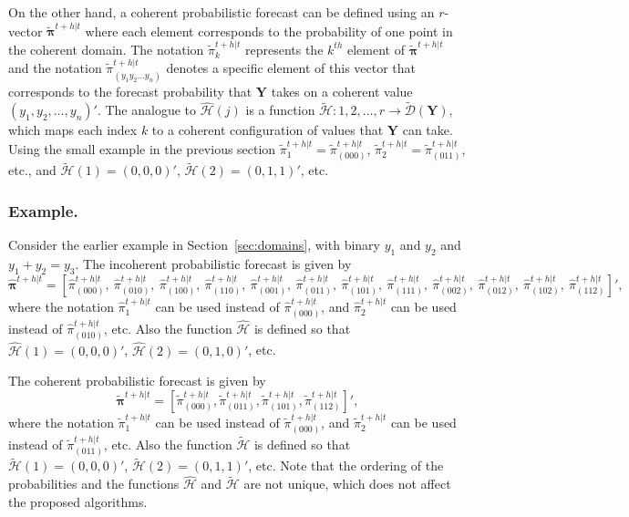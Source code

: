 \documentclass[a4paper,review,12pt,authoryear]{elsarticle}
\newcommand{\bY}{\mathbf{Y}}
\newcommand{\bpi}{\bm{\pi}}
\theoremstyle{definition}
\begin{document}
  On the other hand, a coherent probabilistic forecast can be defined using an $r$-vector $\tilde{\bpi}^{t+h|t}$ where each element corresponds to the probability of one point in the coherent domain.
  The notation $\tilde{\pi}_k^{t+h|t}$ represents the $k^{th}$ element of $\tilde{\bpi}^{t+h|t}$ and the notation $\tilde{\pi}_{(y_1 y_2 \dots y_n)}^{t+h|t}$ denotes a specific element of this vector that corresponds to the forecast probability that $\bY$ takes on a coherent value $(y_1,y_2,\dots,y_n)'$.
  The analogue to $\hat{\mathcal{H}}(j)$ is a function  $\tilde{\mathcal{H}}:{1,2,\dots,r}\rightarrow\tilde{\mathcal{D}}(\bY)$, which maps each index $k$ to a coherent configuration of values that $\bY$ can take.
  Using the small example in the previous section $\tilde{\pi}_1^{t+h|t}=\tilde{\pi}_{(000)}^{t+h|t}$, $\tilde{\pi}_2^{t+h|t}=\tilde{\pi}_{(011)}^{t+h|t}$, etc., and $\tilde{\mathcal{H}}(1)=(0,0,0)'$, $\tilde{\mathcal{H}}(2)=(0,1,1)'$, etc.

  \subsubsection*{\textbf{Example}.}

  Consider the earlier example in Section~\ref{sec:domains}, with binary $y_1$ and $y_2$ and $y_1+y_2=y_3$. The incoherent probabilistic forecast is given by
  \[
    \hat{\bpi}^{t+h|t}= \left[
      \hat{\pi}^{t+h|t}_{(000)}, ~
       \hat{\pi}^{t+h|t}_{(010)},~
       \hat{\pi}^{t+h|t}_{(100)},~
       \hat{\pi}^{t+h|t}_{(110)},~
       \hat{\pi}^{t+h|t}_{(001)},~
       \hat{\pi}^{t+h|t}_{(011)},~
       \hat{\pi}^{t+h|t}_{(101)},~
       \hat{\pi}^{t+h|t}_{(111)},~
       \hat{\pi}^{t+h|t}_{(002)},~
       \hat{\pi}^{t+h|t}_{(012)},~
       \hat{\pi}^{t+h|t}_{(102)},~
       \hat{\pi}^{t+h|t}_{(112)}
       \right]',
  \]
  where the notation $\hat{\pi}^{t+h|t}_{1}$ can be used instead of $\hat{\pi}^{t+h|t}_{(000)}$, and $\hat{\pi}^{t+h|t}_{2}$ can be used instead of $\hat{\pi}^{t+h|t}_{(010)}$, etc. Also the function $\hat{\mathcal{H}}$ is defined so that $\hat{\mathcal{H}}(1)=(0,0,0)'$, $\hat{\mathcal{H}}(2)=(0,1,0)'$, etc.

  The coherent probabilistic forecast is given by
  \[
  \tilde{\bpi}^{t+h|t}=\left[
  \tilde{\pi}^{t+h|t}_{(000)},
  \tilde{\pi}^{t+h|t}_{(011)},
  \tilde{\pi}^{t+h|t}_{(101)},
  \tilde{\pi}^{t+h|t}_{(112)}
  \right]',\]
  where the notation $\tilde{\pi}^{t+h|t}_{1}$ can be used instead of $\tilde{\pi}^{t+h|t}_{(000)}$, and $\tilde{\pi}^{t+h|t}_{2}$ can be used instead of $\tilde{\pi}^{t+h|t}_{(011)}$, etc. Also the function $\tilde{\mathcal{H}}$ is defined so that $\tilde{\mathcal{H}}(1)=(0,0,0)'$, $\tilde{\mathcal{H}}(2)=(0,1,1)'$, etc. Note that the ordering of the probabilities and the functions $\hat{\mathcal{H}}$ and $\tilde{\mathcal{H}}$ are not unique, which does not affect the proposed algorithms.
\end{document}
